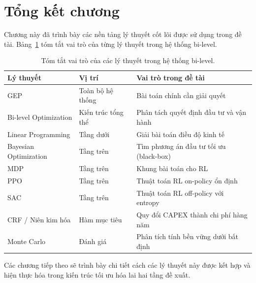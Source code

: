 \section{Tổng kết chương}

Chương này đã trình bày các nền tảng lý thuyết cốt lõi được sử dụng trong đề tài. Bảng~\ref{tab:theory_summary} tóm tắt vai trò của từng lý thuyết trong hệ thống bi-level.

\begin{table}[h!]
\centering
\begin{tabular}{p{4.5cm}p{3cm}p{6cm}}
\toprule
\textbf{Lý thuyết} & \textbf{Vị trí} & \textbf{Vai trò trong đề tài} \\
\midrule
GEP & Toàn bộ hệ thống & Bài toán chính cần giải quyết \\
Bi-level Optimization & Kiến trúc tổng thể & Phân tách quyết định đầu tư và vận hành \\
Linear Programming & Tầng dưới & Giải bài toán điều độ kinh tế \\
Bayesian Optimization & Tầng trên & Tìm phương án đầu tư tối ưu (black-box) \\
MDP & Tầng trên & Khung bài toán cho RL \\
PPO & Tầng trên & Thuật toán RL on-policy ổn định \\
SAC & Tầng trên & Thuật toán RL off-policy với entropy \\
CRF / Niên kim hóa & Hàm mục tiêu & Quy đổi CAPEX thành chi phí hàng năm \\
Monte Carlo & Đánh giá & Phân tích tính bền vững dưới bất định \\
\bottomrule
\end{tabular}
\caption{Tóm tắt vai trò của các lý thuyết trong hệ thống bi-level.}
\label{tab:theory_summary}
\end{table}

Các chương tiếp theo sẽ trình bày chi tiết cách các lý thuyết này được kết hợp và hiện thực hóa trong kiến trúc tối ưu hóa lai hai tầng đề xuất.
